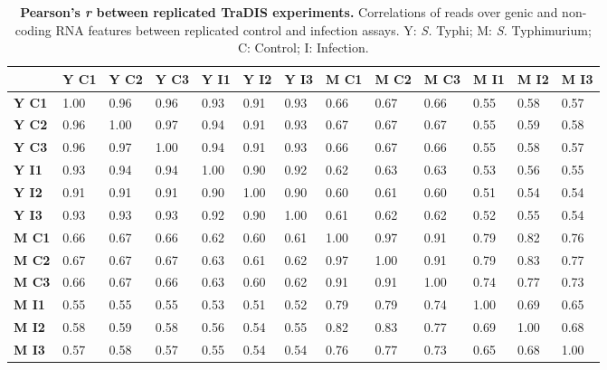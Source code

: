 %
\begin{table}
   \tiny
   \centering
   \noindent
    \caption[Pearson's {\it r} between replicated TraDIS experiments]{\textbf{Pearson's {\it r} between replicated TraDIS experiments.} Correlations of reads over genic and non-coding RNA features between replicated control and infection assays. Y: \textit{S.} Typhi; M: \textit{S.} Typhimurium; C: Control; I: Infection. }
    \begin{tabular}{ l
    				l
				l
				l
				l
				l
				l
				l
				l
				l
				l
				l
				l
				}
   
    \\
     \toprule
    &\textbf{Y C1} & \textbf{Y C2} & \textbf{Y C3} & \textbf{Y I1} & \textbf{Y I2} & \textbf{Y I3} &  \textbf{M C1}&  \textbf{M C2} &  \textbf{M C3} &  \textbf{M I1}&  \textbf{M I2}&  \textbf{M I3}\\
    \midrule
\textbf{Y C1} &   1.00 & 0.96 & 0.96 & 0.93 & 0.91 & 0.93 & 0.66 & 0.67 & 0.66 & 0.55 & 0.58 & 0.57\\
\textbf{Y C2} &  0.96 & 1.00 & 0.97 & 0.94 & 0.91 & 0.93 & 0.67 & 0.67 & 0.67 & 0.55 & 0.59 & 0.58\\
 \textbf{Y C3} & 0.96 & 0.97 & 1.00 & 0.94 & 0.91 & 0.93 & 0.66 & 0.67 & 0.66 & 0.55 & 0.58 & 0.57\\
 \textbf{Y I1} & 0.93 & 0.94 & 0.94 & 1.00 & 0.90 & 0.92 & 0.62 & 0.63 & 0.63 & 0.53 & 0.56 & 0.55\\
\textbf{Y I2} &  0.91 & 0.91 & 0.91 & 0.90 & 1.00 & 0.90 & 0.60 & 0.61 & 0.60 & 0.51 & 0.54 & 0.54\\
  \textbf{Y I3} & 0.93 & 0.93 & 0.93 & 0.92 & 0.90 & 1.00 & 0.61 & 0.62 & 0.62 & 0.52 & 0.55 & 0.54\\
 \textbf{M C1}&  0.66 & 0.67 & 0.66 & 0.62 & 0.60 & 0.61 & 1.00 & 0.97 & 0.91 & 0.79 & 0.82 & 0.76\\
\textbf{M C2}&  0.67 & 0.67 & 0.67 & 0.63 & 0.61 & 0.62 & 0.97 & 1.00 & 0.91 & 0.79 & 0.83 & 0.77\\
 \textbf{M C3} &  0.66 & 0.67 & 0.66 & 0.63 & 0.60 & 0.62 & 0.91 & 0.91 & 1.00 & 0.74 & 0.77 & 0.73\\
 \textbf{M I1} & 0.55 & 0.55 & 0.55 & 0.53 & 0.51 & 0.52 & 0.79 & 0.79 & 0.74 & 1.00 & 0.69 & 0.65\\
  \textbf{M I2} & 0.58 & 0.59 & 0.58 & 0.56 & 0.54 & 0.55 & 0.82 & 0.83 & 0.77 & 0.69 & 1.00 & 0.68\\
 \textbf{M I3} &  0.57 & 0.58 & 0.57 & 0.55 & 0.54 & 0.54 & 0.76 & 0.77 & 0.73 & 0.65 & 0.68 & 1.00\\
    \bottomrule
    \end{tabular}%
    \label{tab:corr}%
\end{table}

